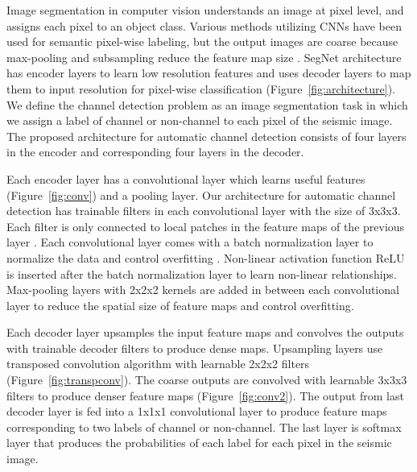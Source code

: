 Image segmentation in computer vision understands an image at pixel level, and assigns each pixel to an object class. Various methods utilizing CNNs have been used for semantic pixel-wise labeling, but the output images are coarse because max-pooling and subsampling reduce the feature map size \cite[]{SegNet}. SegNet architecture has encoder layers to learn low resolution features and uses decoder layers to map them to input resolution for pixel-wise classification \cite[]{SegNet} (Figure~\ref{fig:architecture}). We define the channel detection problem as an image segmentation task in which we assign a label of channel or non-channel to each pixel of the seismic image. The proposed architecture for automatic channel detection consists of four layers in the encoder and corresponding four layers in the decoder.

Each encoder layer has a convolutional layer which learns useful features (Figure~\ref{fig:conv}) and a pooling layer. Our architecture for automatic channel detection has trainable filters in each convolutional layer with the size of 3x3x3. Each filter is only connected to local patches in the feature maps of the previous layer \cite[]{nature}. Each convolutional layer comes with a batch normalization layer to normalize the data and control overfitting \cite[]{BN}. Non-linear activation function ReLU is inserted after the batch normalization layer to learn non-linear relationships. Max-pooling layers with 2x2x2 kernels are added in between each convolutional layer to reduce the spatial size of feature maps and control overfitting.         

Each decoder layer upsamples the input feature maps and convolves the outputs with trainable decoder filters to produce dense maps. Upsampling layers use transposed convolution algorithm \cite[]{Dumoulin2016AGT} with learnable 2x2x2 filters (Figure~\ref{fig:transpconv}). The coarse outputs are convolved with learnable 3x3x3 filters to produce denser feature maps (Figure~\ref{fig:conv2}). The output from last decoder layer is fed into a 1x1x1 convolutional layer to produce feature maps corresponding to two labels of channel or non-channel. The last layer is softmax layer that produces the probabilities of each label for each pixel in the seismic image.
   
